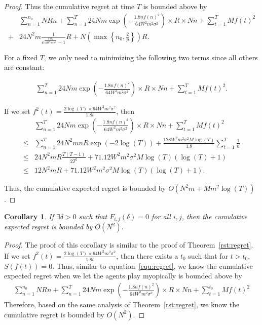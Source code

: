 \documentclass{article}
\newtheorem{corollary}{Corollary}
\begin{document}
\begin{proof}
 Thus the cumulative regret at time $T$ is bounded above by
\begin{align}
&\sum_{n=1}^{n_{0}}NRn + \sum_{n=1}^{T} 24Nm\exp\left(-\frac{1.8n f(n)^2}{64 W^2 m^2\sigma^2}\right)\times R \times Nn+ \sum_{t=1}^{T}Mf(t)^2 \nonumber \\
+ & 24N^2 m \frac{1}{e^{\frac{1.8\delta_{0}}{64W^2 m^2\sigma^2}}-1}R+N\left(\max\left\{n_{0},\frac{2}{p}\right\}\right)R. \nonumber
\end{align}

For a fixed $T$, we only need to minimizing the following two terms since all others are constant:

\begin{align}
\sum_{n=1}^{T} 24Nm\exp\left(-\frac{1.8n f(n)^2}{64 W^2 m^2\sigma^2}\right)\times R \times Nn+ \sum_{t=1}^{T}Mf(t)^2.
\end{align}


If we set $f^2(t)=\frac{2\log(T)\times 64W^2 m^2\sigma^2}{1.8t}$, then
\begin{align}
&\sum_{n=1}^{T} 24Nm\exp\left(-\frac{1.8n f(n)^2}{64 W^2 m^2\sigma^2}\right)\times R \times Nn+ \sum_{t=1}^{T}Mf(t)^2 \nonumber \\ 
\leq & \sum_{n=1}^{T} 24N^2 mnR \exp\left(-2\log(T)\right)  + \frac{128W^2 m^2\sigma^2 M\log(T)}{1.8}\sum_{t=1}^{T}\frac{1}{n} \nonumber \\
\leq &  24N^2 m R\frac{T(T-1)}{2T^2}  + 71.12 W^2 m^2\sigma^2 M\log(T)(\log(T)+1) \nonumber \\
\leq &  12 N^2 m R  + 71.12 W^2 m^2\sigma^2 M\log(T)(\log(T)+1). \nonumber
\end{align}

Thus, the cumulative expected regret is bounded by $O(N^2 m + M m^2\log(T))$.
\end{proof}

\begin{corollary}
If $\exists \delta>0$ such that $F_{i,j}(\delta)=0$ for all $i,j$, then the cumulative expected regret is bounded by $O(N^2)$.
\end{corollary}

\begin{proof}
The proof of this corollary is similar to the proof of Theorem~\ref{rst:regret}. If we set $f^2(t)=\frac{2\log(T)\times 64W^2 m^2\sigma^2}{1.8t}$, then there exists a $t_{0}$ such that for $t>t_{0}$, $S(f(t))=0$. Thus, similar to equation~\eqref{equ:regret}, we know the cumulative expected regret when we let the agents play myopically is bounded above by
\begin{align}
\sum_{n=1}^{n_{0}}NRn + \sum_{n=1}^{T} 24Nm\exp\left(-\frac{1.8n f(n)^2}{64 W^2 m^2\sigma^2}\right)\times R \times Nn+ \sum_{t=1}^{t_{0}}Mf(t)^2 \nonumber
\end{align}
Therefore, based on the same analysis of Theorem~\ref{rst:regret}, we know the cumulative regret is bounded by $O(N^2)$.
\end{proof}
\end{document}
